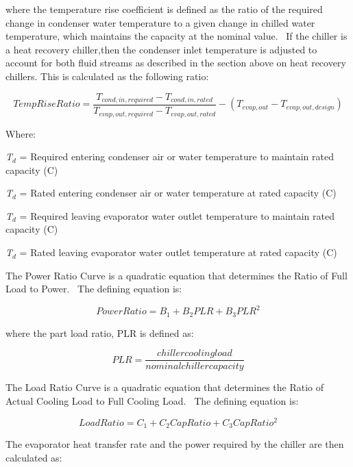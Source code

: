 where the temperature rise coefficient is defined as the ratio of the required change in condenser water temperature to a given change in chilled water temperature, which maintains the capacity at the nominal value.~ If the chiller is a heat recovery chiller,then the condenser inlet temperature is adjusted to account for both fluid streams as described in the section above on heat recovery chillers. This is calculated as the following ratio:

\begin{equation}
TempRiseRatio = \frac{{{T_{cond, in,required}} - {T_{cond,in,rated}}}}{{{T_{evap, out,required}} - {T_{evap,out,rated}}}} - \left( {{T_{evap,out}} - {T_{evap,out,design}}} \right)
\end{equation}

Where:

\emph{T\(_{d}\)} = Required entering condenser air or water temperature to maintain rated capacity (C)

\emph{T\(_{d}\)} = Rated entering condenser air or water temperature at rated capacity (C)

\emph{T\(_{d}\)} = Required leaving evaporator water outlet temperature to maintain rated capacity (C)

\emph{T\(_{d}\)} = Rated leaving evaporator water outlet temperature at rated capacity (C)

The Power Ratio Curve is a quadratic equation that determines the Ratio of Full Load to Power.~ The defining equation is:

\begin{equation}
PowerRatio = {B_1} + {B_2}PLR + {B_3}PL{R^2}
\end{equation}

where the part load ratio, PLR is defined as:

\begin{equation}
PLR = \frac{{chiller cooling load}}{{nominal chiller capacity}}
\end{equation}

The Load Ratio Curve is a quadratic equation that determines the Ratio of Actual Cooling Load to Full Cooling Load.~ The defining equation is:

\begin{equation}
LoadRatio = {C_1} + {C_2}CapRatio + {C_3}CapRati{o^2}
\end{equation}

The evaporator heat transfer rate and the power required by the chiller are then calculated as:


